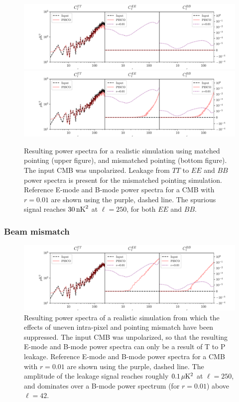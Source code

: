 \documentclass[a4paper,11pt]{article}
\begin{document}
\begin{figure}
    \centering
    \includegraphics[width=1\textwidth]{figures/unpol.pdf}
    \includegraphics[width=1\textwidth]{figures/pointingMismatch.pdf}
	\caption{Resulting power spectra for a realistic simulation using matched pointing (upper figure), and mismatched pointing (bottom figure). The input CMB was unpolarized. Leakage from $TT$ to $EE$ and $BB$ power spectra is present for the mismatched pointing simulation. Reference E-mode and B-mode power spectra for a CMB with $r=0.01$ are shown using the purple, dashed line. The spurious signal reaches $30\, \rm{nK}^2$ at $\ell = 250$, for both $EE$ and $BB$.}
	\label{fig::pisco4class_pointingmismatch}
\end{figure}

\subsubsection{Beam mismatch}

\begin{figure}
	\centering
	\includegraphics[width=1\textwidth]{figures/beamMismatch.pdf}
	\caption{Resulting power spectra of a realistic simulation from which the effects of uneven intra-pixel and pointing mismatch have been suppressed. The input CMB was unpolarized, so that the resulting E-mode and B-mode power spectra can only be a result of T to P leakage. Reference E-mode and B-mode power spectra for a CMB with $r=0.01$ are shown using the purple, dashed line. The amplitude of the leakage signal reaches roughly $0.1\, \mu\rm{K}^2$ at $\ell=250$, and dominates over a B-mode power spectrum (for $r=0.01$) above $\ell=42$.}
	\label{fig::pisco4class_beammismatch}
\end{figure}
\end{document}
